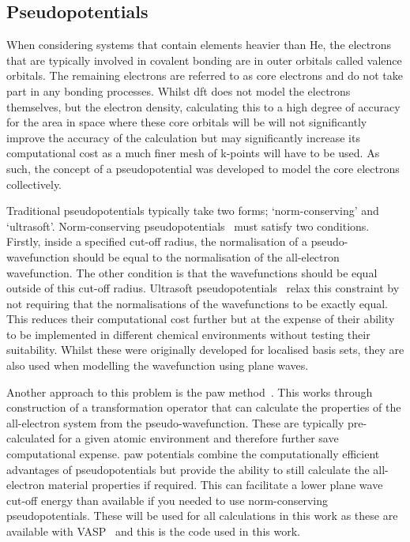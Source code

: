 \subsection{Pseudopotentials}
\label{subsec:pseudopot}
When considering systems that contain elements heavier than He, the electrons that are typically involved in covalent bonding are in outer orbitals called valence orbitals. The remaining electrons are referred to as core electrons and do not take part in any bonding processes. Whilst \acrshort{dft} does not model the electrons themselves, but the electron density, calculating this to a high degree of accuracy for the area in space where these core orbitals will be will not significantly improve the accuracy of the calculation but may significantly increase its computational cost as a much finer mesh of k\nobreakdash-points will have to be used. As such, the concept of a pseudopotential was developed to model the core electrons collectively.

Traditional pseudopotentials typically take two forms; `norm\nobreakdash-conserving' and `ultrasoft'. Norm\nobreakdash-conserving pseudopotentials~\cite{Hamann1979} must satisfy two conditions. Firstly, inside a specified cut\nobreakdash-off radius, the normalisation of a pseudo\nobreakdash-wavefunction should be equal to the normalisation of the all\nobreakdash-electron wavefunction. The other condition is that the wavefunctions should be equal outside of this cut\nobreakdash-off radius. Ultrasoft pseudopotentials~\cite{Vanderbilt1990} relax this constraint by not requiring that the normalisations of the wavefunctions to be exactly equal. This reduces their computational cost further but at the expense of their ability to be implemented in different chemical environments without testing their suitability. Whilst these were originally developed for localised basis sets, they are also used when modelling the wavefunction using plane waves.

Another approach to this problem is the \acrfull{paw} method~\cite{Blochl1994}. This works through construction of a transformation operator that can calculate the properties of the all\nobreakdash-electron system from the pseudo\nobreakdash-wavefunction. These are typically pre\nobreakdash-calculated for a given atomic environment and therefore further save computational expense. \acrshort{paw} potentials combine the computationally efficient advantages of pseudopotentials but provide the ability to still calculate the all\nobreakdash-electron material properties if required. This can facilitate a lower plane wave cut\nobreakdash-off energy than available if you needed to use norm\nobreakdash-conserving pseudopotentials. These will be used for all calculations in this work as these are available with VASP~\cite{Hafner2008} and this is the code used in this work.

